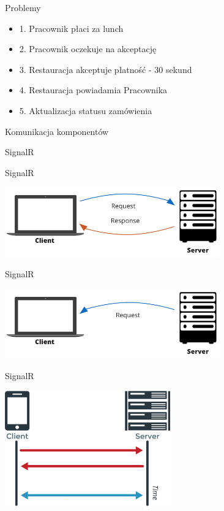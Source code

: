 \documentclass{beamer}
\begin{document}
\begin{frame}{Problemy}
	\begin{Large}
		\begin{itemize}[<+->]
			\item 1. Pracownik płaci za lunch
			\item 2. Pracownik oczekuje na akceptację
			\item 3. Restauracja akceptuje płatność - 30 sekund
			\item 4. Restauracja powiadamia Pracownika
			\item 5. Aktualizacja statusu zamówienia
		\end{itemize}
	\end{Large}
\end{frame}

\begin{frame}{Komunikacja komponentów}
	\begin{center}
		\Huge{SignalR}
	\end{center}
\end{frame}

\begin{frame}{SignalR}
	\begin{center}
		\includegraphics[height=3cm]{prosta_komunikacja2.png}
	\end{center}
\end{frame}

\begin{frame}{SignalR}
	\begin{center}
		\includegraphics[height=3cm]{signalr1.png}
	\end{center}
\end{frame}

\begin{frame}{SignalR}
	\begin{center}
		\includegraphics[height=5cm]{websocket1.png}
	\end{center}
\end{frame}
\end{document}
